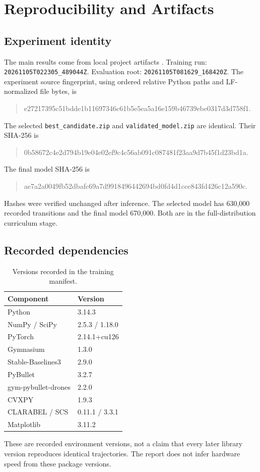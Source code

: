 \chapter{Reproducibility and Artifacts}\label{app:repro}
\section{Experiment identity}
The main results come from local project artifacts \parencite{projectdata}. Training run: \texttt{20261105T022305\_489044Z}. Evaluation root: \texttt{20261105T081629\_168420Z}. The experiment source fingerprint, using ordered relative Python paths and LF-normalized file bytes, is
\begin{quote}\small\ttfamily
e27217395c51bdde1b11697346c61b5e5\allowbreak ea5a16e159b46739ebe0317d3d758f1.
\end{quote}
The selected \texttt{best\_candidate.zip} and \texttt{validated\_model.zip} are identical. Their SHA-256 is
\begin{quote}\small\ttfamily
0b58672c4e2d794b19e04e02ef9c4c56\allowbreak ab091c087481f23aa9d7b45f1d23bd1a.
\end{quote}
The final model SHA-256 is
\begin{quote}\small\ttfamily
ae7a2a0049fb52dbafc69a7d99184964\allowbreak 42694bd0fd4d1cce843fd426c12a590c.
\end{quote}
Hashes were verified unchanged after inference. The selected model has 630,000 recorded transitions and the final model 670,000. Both are in the full-distribution curriculum stage.

\section{Recorded dependencies}
\begin{table}[htbp]\centering
\caption{Versions recorded in the training manifest.}\label{tab:versions}
\begin{tabular}{ll}\toprule Component & Version\\\midrule
Python & 3.14.3\\NumPy / SciPy & 2.5.3 / 1.18.0\\
PyTorch & 2.14.1+cu126\\Gymnasium & 1.3.0\\
Stable-Baselines3 & 2.9.0\\PyBullet & 3.2.7\\
gym-pybullet-drones & 2.2.0\\CVXPY & 1.9.3\\
CLARABEL / SCS & 0.11.1 / 3.3.1\\
Matplotlib & 3.11.2\\\bottomrule
\end{tabular}\end{table}
These are recorded environment versions, not a claim that every later library version reproduces identical trajectories. The report does not infer hardware speed from these package versions.

